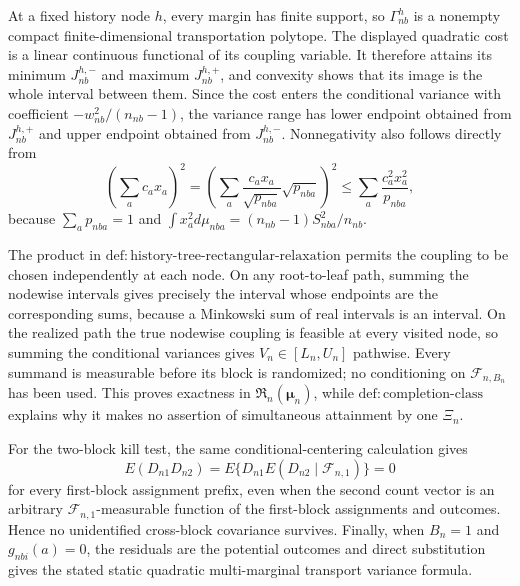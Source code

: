 At a fixed history node \(h\), every margin has finite support, so \(\Gamma_{nb}^h\) is a nonempty compact finite-dimensional transportation polytope.  The displayed quadratic cost is a linear continuous functional of its coupling variable.  It therefore attains its minimum \(J_{nb}^{h,-}\) and maximum \(J_{nb}^{h,+}\), and convexity shows that its image is the whole interval between them.  Since the cost enters the conditional variance with coefficient \(-w_{nb}^2/(n_{nb}-1)\), the variance range has lower endpoint obtained from \(J_{nb}^{h,+}\) and upper endpoint obtained from \(J_{nb}^{h,-}\).  Nonnegativity also follows directly from
\[
 \left(\sum_ac_ax_a\right)^2
 =\left(\sum_a\frac{c_ax_a}{\sqrt{p_{nba}}}\sqrt{p_{nba}}\right)^2
 \le\sum_a\frac{c_a^2x_a^2}{p_{nba}},
\]
because \(\sum_ap_{nba}=1\) and
\(\int x_a^2d\mu_{nba}=(n_{nb}-1)S_{nba}^2/n_{nb}\).

The product in \(\mathrm{def:history\text{-}tree\text{-}rectangular\text{-}relaxation}\) permits the coupling to be chosen independently at each node.  On any root-to-leaf path, summing the nodewise intervals gives precisely the interval whose endpoints are the corresponding sums, because a Minkowski sum of real intervals is an interval.  On the realized path the true nodewise coupling is feasible at every visited node, so summing the conditional variances gives \(V_n\in[L_n,U_n]\) pathwise.  Every summand is measurable before its block is randomized; no conditioning on \(\mathcal F_{n,B_n}\) has been used.  This proves exactness in \(\mathfrak R_n(\boldsymbol\mu_n)\), while \(\mathrm{def:completion\text{-}class}\) explains why it makes no assertion of simultaneous attainment by one \(\Xi_n\).

For the two-block kill test, the same conditional-centering calculation gives
\[
 E(D_{n1}D_{n2})=E\{D_{n1}E(D_{n2}\mid\mathcal F_{n,1})\}=0
\]
for every first-block assignment prefix, even when the second count vector is an arbitrary \(\mathcal F_{n,1}\)-measurable function of the first-block assignments and outcomes.  Hence no unidentified cross-block covariance survives.  Finally, when \(B_n=1\) and \(g_{nbi}(a)=0\), the residuals are the potential outcomes and direct substitution gives the stated static quadratic multi-marginal transport variance formula.